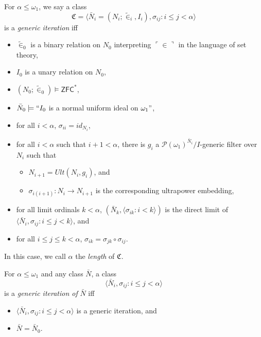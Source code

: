 \documentclass[12pt]{article}
\numberwithin{equation}{section}
\begin{document}
\begin{defi}\label{def257}
For $\alpha \leq \omega_1$, we say a class $$\mathfrak{C} = \langle \bar{N}_i = (N_i; \tilde{\in}_i, I_i), \sigma_{ij} : i \leq j < \alpha \rangle$$ is a \emph{generic iteration} iff 
\begin{itemize}
    \item $\tilde{\in}_0$ is a binary relation on $N_0$ interpreting $\ulcorner \in \urcorner$ in the language of set theory,
    \item $I_0$ is a unary relation on $N_0$,
    \item $(N_0; \tilde{\in}_0) \models \mathsf{ZFC}^*$,
    \item $\bar{N}_0 \models ``I_0$ is a normal uniform ideal on $\omega_1"$, 
    \item for all $i < \alpha$, $\sigma_{ii} = id_{N_i}$,
    \item for all $i < \alpha$ such that $i + 1 < \alpha$, there is $g_{i}$ a $\mathcal{P}(\omega_1)^{\bar{N}_{i}} / I$-generic filter over $N_{i}$ such that 
    \begin{itemize}[label=$\circ$]
        \item $N_{i + 1} = Ult(N_{i}, g_{i})$, and
        \item $\sigma_{i(i + 1)} : N_{i} \longrightarrow N_{i + 1}$ is the corresponding ultrapower embedding,
    \end{itemize}
    \item for all limit ordinals $k < \alpha$, $(\bar{N}_{k}, \langle \sigma_{ik} : i < k \rangle)$ is the direct limit of $\langle \bar{N}_i, \sigma_{ij} : i \leq j < k \rangle$, and
    \item for all $i \leq j \leq k < \alpha$, $\sigma_{ik} = \sigma_{jk} \circ \sigma_{ij}$.
\end{itemize}
In this case, we call $\alpha$ the \emph{length} of $\mathfrak{C}$.
\end{defi}

\begin{defi}
For $\alpha \leq \omega_1$ and any class $\bar{N}$, a class $$\langle \bar{N}_i, \sigma_{ij} : i \leq j < \alpha \rangle$$ is a \emph{generic iteration of} $\bar{N}$ iff 
\begin{itemize}
    \item $\langle \bar{N}_i, \sigma_{ij} : i \leq j < \alpha \rangle$ is a generic iteration, and
    \item $\bar{N} = \bar{N}_0$.
\end{itemize}
\end{defi}
\end{document}
